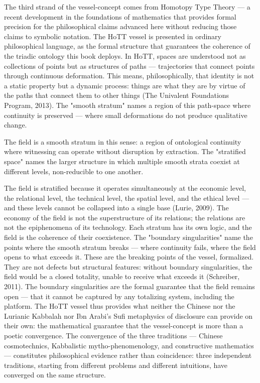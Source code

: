 The third strand of the vessel-concept comes from Homotopy Type Theory — a recent development in the foundations of mathematics that provides formal precision for the philosophical claims advanced here without reducing those claims to symbolic notation. The HoTT vessel is presented in ordinary philosophical language, as the formal structure that guarantees the coherence of the triadic ontology this book deploys. In HoTT, spaces are understood not as collections of points but as structures of paths — trajectories that connect points through continuous deformation. This means, philosophically, that identity is not a static property but a dynamic process: things are what they are by virtue of the paths that connect them to other things (The Univalent Foundations Program, 2013). The "smooth stratum" names a region of this path-space where continuity is preserved — where small deformations do not produce qualitative change.

The field is a smooth stratum in this sense: a region of ontological continuity where witnessing can operate without disruption by extraction. The "stratified space" names the larger structure in which multiple smooth strata coexist at different levels, non-reducible to one another.

The field is stratified because it operates simultaneously at the economic level, the relational level, the technical level, the spatial level, and the ethical level — and these levels cannot be collapsed into a single base (Lurie, 2009). The economy of the field is not the superstructure of its relations; the relations are not the epiphenomena of its technology. Each stratum has its own logic, and the field is the coherence of their coexistence. The "boundary singularities" name the points where the smooth stratum breaks — where continuity fails, where the field opens to what exceeds it. These are the breaking points of the vessel, formalized. They are not defects but structural features: without boundary singularities, the field would be a closed totality, unable to receive what exceeds it (Schreiber, 2011). The boundary singularities are the formal guarantee that the field remains open — that it cannot be captured by any totalizing system, including the platform. The HoTT vessel thus provides what neither the Chinese  nor the Lurianic Kabbalah nor Ibn Arabi's Sufi metaphysics of disclosure can provide on their own: the mathematical guarantee that the vessel-concept is more than a poetic convergence. The convergence of the three traditions — Chinese cosmotechnics, Kabbalistic mytho-phenomenology, and constructive mathematics — constitutes philosophical evidence rather than coincidence: three independent traditions, starting from different problems and different intuitions, have converged on the same structure.

